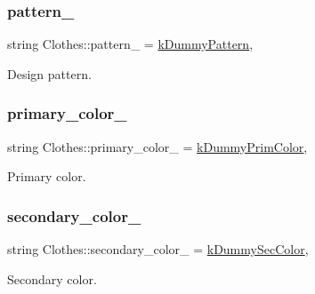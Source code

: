 \subsubsection{\texorpdfstring{pattern\+\_\+}{pattern\_}}
{\footnotesize\ttfamily string Clothes\+::pattern\+\_\+ = \mbox{\hyperlink{clothes_8h_a2e72ae4d77adb7bc9cbecf4dea1e9e22}{k\+Dummy\+Pattern}}\hspace{0.3cm}{\ttfamily [protected]}, {\ttfamily [inherited]}}



Design pattern. 

\mbox{\label{classClothes_a7cb005bf6cbb7f4eaa40f1b31817559c}} 
\subsubsection{\texorpdfstring{primary\+\_\+color\+\_\+}{primary\_color\_}}
{\footnotesize\ttfamily string Clothes\+::primary\+\_\+color\+\_\+ = \mbox{\hyperlink{clothes_8h_a1b9c685d3bf2811d95b65e0d396c1344}{k\+Dummy\+Prim\+Color}}\hspace{0.3cm}{\ttfamily [protected]}, {\ttfamily [inherited]}}



Primary color. 

\mbox{\label{classClothes_ab8f55f67b956b25d71260cffcf273673}} 
\subsubsection{\texorpdfstring{secondary\+\_\+color\+\_\+}{secondary\_color\_}}
{\footnotesize\ttfamily string Clothes\+::secondary\+\_\+color\+\_\+ = \mbox{\hyperlink{clothes_8h_a71c39811135425d881af7760da63a73a}{k\+Dummy\+Sec\+Color}}\hspace{0.3cm}{\ttfamily [protected]}, {\ttfamily [inherited]}}



Secondary color. 

\mbox{\label{classClothes_a012aeb71e62ebaf9b5b5dd700cc8d5db}} 

